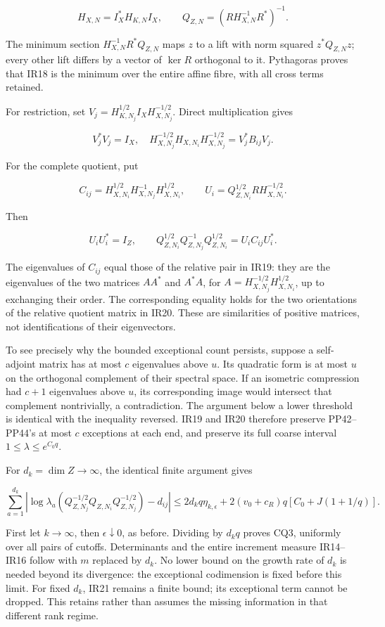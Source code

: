 \documentclass[10pt]{article}
\begin{document}
\[
 H_{X,N}=I_X^*H_{K,N}I_X,\qquad Q_{Z,N}=(R H_{X,N}^{-1}R^*)^{-1}.
 \tag{IR18}
\]

The minimum section \(H_{X,N}^{-1}R^*Q_{Z,N}\) maps \(z\) to a lift with norm squared \(z^*Q_{Z,N}z\); every other lift differs by a vector of \(\ker R\) orthogonal to it. Pythagoras proves that IR18 is the minimum over the entire affine fibre, with all cross terms retained.

For restriction, set \(V_j=H_{K,N_j}^{1/2}I_XH_{X,N_j}^{-1/2}\). Direct multiplication gives

\[
 V_j^*V_j=I_X,\quad
 H_{X,N_j}^{-1/2}H_{X,N_i}H_{X,N_j}^{-1/2}=V_j^*B_{ij}V_j.
 \tag{IR19}
\]

For the complete quotient, put

\[
 C_{ij}=H_{X,N_i}^{1/2}H_{X,N_j}^{-1}H_{X,N_i}^{1/2},\qquad
 U_i=Q_{Z,N_i}^{1/2}R H_{X,N_i}^{-1/2}.
\]

Then

\[
 U_iU_i^*=I_Z,\qquad
 Q_{Z,N_i}^{1/2}Q_{Z,N_j}^{-1}Q_{Z,N_i}^{1/2}=U_iC_{ij}U_i^*.
 \tag{IR20}
\]

The eigenvalues of \(C_{ij}\) equal those of the relative pair in IR19: they are the eigenvalues of the two matrices \(AA^*\) and \(A^*A\), for \(A=H_{X,N_j}^{-1/2}H_{X,N_i}^{1/2}\), up to exchanging their order. The corresponding equality holds for the two orientations of the relative quotient matrix in IR20. These are similarities of positive matrices, not identifications of their eigenvectors.

To see precisely why the bounded exceptional count persists, suppose a self-adjoint matrix has at most \(c\) eigenvalues above \(u\). Its quadratic form is at most \(u\) on the orthogonal complement of their spectral space. If an isometric compression had \(c+1\) eigenvalues above \(u\), its corresponding image would intersect that complement nontrivially, a contradiction. The argument below a lower threshold is identical with the inequality reversed. IR19 and IR20 therefore preserve PP42--PP44's at most \(c\) exceptions at each end, and preserve its full coarse interval \(1\le\lambda\le e^{C_0q}\).

For \(d_k=\dim Z\to\infty\), the identical finite argument gives

\[
 \sum_{a=1}^{d_k}\left|
 \log\lambda_a(Q_{Z,N_j}^{-1/2}Q_{Z,N_i}Q_{Z,N_j}^{-1/2})-d_{ij}\right|
 \le2d_kq\eta_{k,\epsilon}
 +2(v_0+c_R)q[C_0+J(1+1/q)].
 \tag{IR21}
\]

First let \(k\to\infty\), then \(\epsilon\downarrow0\), as before. Dividing by \(d_kq\) proves CQ3, uniformly over all pairs of cutoffs. Determinants and the entire increment measure IR14--IR16 follow with \(m\) replaced by \(d_k\). No lower bound on the growth rate of \(d_k\) is needed beyond its divergence: the exceptional codimension is fixed before this limit. For fixed \(d_k\), IR21 remains a finite bound; its exceptional term cannot be dropped. This retains rather than assumes the missing information in that different rank regime.
\end{document}
